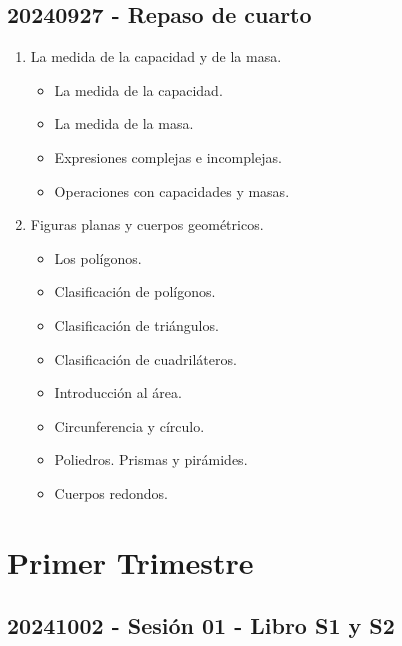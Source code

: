 \documentclass[a4paper,12pt]{article}
\begin{document}
\subsection{20240927 - Repaso de cuarto}

\begin{enumerate}
    \item La medida de la capacidad y de la masa.
    \begin{itemize}
        \item La medida de la capacidad.
        \item La medida de la masa.
        \item Expresiones complejas e incomplejas.
        \item Operaciones con capacidades y masas.
    \end{itemize}
    \item Figuras planas y cuerpos geométricos.
    \begin{itemize}
        \item Los polígonos.
        \item Clasificación de polígonos.
        \item Clasificación de triángulos.
        \item Clasificación de cuadriláteros.
        \item Introducción al área.
        \item Circunferencia y círculo.
        \item Poliedros. Prismas y pirámides.
        \item Cuerpos redondos.
    \end{itemize}
\end{enumerate}

\newpage

\section{Primer Trimestre}

\subsection{20241002 - Sesión 01 - Libro S1 y S2}
\end{document}
